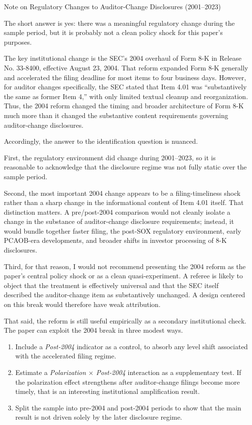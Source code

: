 \documentclass[11pt]{article}
\begin{document}
\begin{center}
{\Large Note on Regulatory Changes to Auditor-Change Disclosures (2001--2023)}
\end{center}

The short answer is yes: there was a meaningful regulatory change during the sample period, but it is probably not a clean policy shock for this paper's purposes.

The key institutional change is the SEC's 2004 overhaul of Form 8-K in Release No. 33-8400, effective August 23, 2004. That reform expanded Form 8-K generally and accelerated the filing deadline for most items to four business days. However, for auditor changes specifically, the SEC stated that Item 4.01 was ``substantively the same as former Item 4,'' with only limited textual cleanup and reorganization. Thus, the 2004 reform changed the timing and broader architecture of Form 8-K much more than it changed the substantive content requirements governing auditor-change disclosures.

Accordingly, the answer to the identification question is nuanced.

First, the regulatory environment did change during 2001--2023, so it is reasonable to acknowledge that the disclosure regime was not fully static over the sample period.

Second, the most important 2004 change appears to be a filing-timeliness shock rather than a sharp change in the informational content of Item 4.01 itself. That distinction matters. A pre/post-2004 comparison would not cleanly isolate a change in the substance of auditor-change disclosure requirements; instead, it would bundle together faster filing, the post-SOX regulatory environment, early PCAOB-era developments, and broader shifts in investor processing of 8-K disclosures.

Third, for that reason, I would not recommend presenting the 2004 reform as the paper's central policy shock or as a clean quasi-experiment. A referee is likely to object that the treatment is effectively universal and that the SEC itself described the auditor-change item as substantively unchanged. A design centered on this break would therefore have weak attribution.

That said, the reform is still useful empirically as a secondary institutional check. The paper can exploit the 2004 break in three modest ways.

\begin{enumerate}
    \item Include a \textit{Post-2004} indicator as a control, to absorb any level shift associated with the accelerated filing regime.
    \item Estimate a \textit{Polarization $\times$ Post-2004} interaction as a supplementary test. If the polarization effect strengthens after auditor-change filings become more timely, that is an interesting institutional amplification result.
    \item Split the sample into pre-2004 and post-2004 periods to show that the main result is not driven solely by the later disclosure regime.
\end{enumerate}
\end{document}

